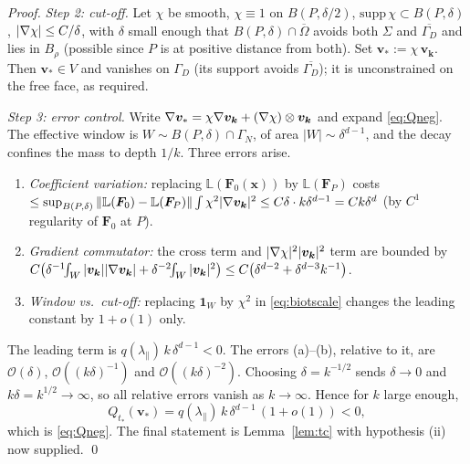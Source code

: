 \begin{proof}
    \emph{Step 2: cut-off.} Let $\chi$ be smooth, $\chi\equiv1$ on $B(P,\delta/2)$, $\mathrm{supp}\,\chi\subset
        B(P,\delta)$, $|\nabla\chi|\le C/\delta$, with $\delta$ small enough that $B(P,\delta)\cap\overline\Omega$ avoids
    both $\Sigma$ and $\overline{\Gamma_D}$ and lies in $B_\rho$ (possible since $P$ is at positive distance from both).
    Set $\bm{v}_*:=\chi\,\bm{v}_{\bm{k}}$. Then $\bm{v}_*\in V$ and vanishes on $\Gamma_D$ (its support avoids
    $\overline{\Gamma_D}$); it is unconstrained on the free face, as required.

    \emph{Step 3: error control.} Write $\nabla\bm{v}_*=\chi\nabla\bm{v}_{\bm{k}}+(\nabla\chi)\otimes\bm{v}_{\bm{k}}$ and
    expand \eqref{eq:Qneg}. The effective window is $W\sim B(P,\delta)\cap\Gamma_N$, of area $|W|\sim\delta^{d-1}$, and the
    decay confines the mass to depth $1/k$. Three errors arise.
    \begin{enumerate}
        \item[(a)] \emph{Coefficient variation:} replacing $\mathbb{L}(\bm{F}_0(\bm{x}))$ by $\mathbb{L}(\bm{F}_P)$ costs
              $\le \sup_{B(P,\delta)}\|\mathbb{L}(\bm{F}_0)-\mathbb{L}(\bm{F}_P)\|\int\chi^2|\nabla\bm{v}_{\bm{k}}|^2
                  \le C\delta\cdot k\delta^{d-1}=Ck\delta^{d}$ (by $C^1$ regularity of $\bm{F}_0$ at $P$).
        \item[(b)] \emph{Gradient commutator:} the cross term and $|\nabla\chi|^2|\bm{v}_{\bm{k}}|^2$ term are bounded by
              $C\big(\delta^{-1}\!\!\int_W |\bm{v}_{\bm{k}}||\nabla\bm{v}_{\bm{k}}| + \delta^{-2}\!\!\int_W|\bm{v}_{\bm{k}}|^2\big)
                  \le C\big(\delta^{d-2} + \delta^{d-3}k^{-1}\big)$.
        \item[(c)] \emph{Window vs.\ cut-off:} replacing $\mathbf{1}_W$ by $\chi^2$ in \eqref{eq:biotscale} changes the
              leading constant by $1+o(1)$ only.
    \end{enumerate}
    The leading term is $q(\lambda_\parallel)\,k\,\delta^{d-1}<0$. The errors (a)--(b), relative to it, are
    $\mathcal{O}(\delta)$, $\mathcal{O}((k\delta)^{-1})$ and $\mathcal{O}((k\delta)^{-2})$. Choosing $\delta=k^{-1/2}$
    sends $\delta\to0$ and $k\delta=k^{1/2}\to\infty$, so all relative errors vanish as $k\to\infty$. Hence for $k$ large
    enough,
    \[
        Q_{t_*}(\bm{v}_*) = q(\lambda_\parallel)\,k\,\delta^{d-1}\,(1+o(1)) < 0,
    \]
    which is \eqref{eq:Qneg}. The final statement is Lemma~\ref{lem:tc} with hypothesis (ii) now supplied. \qed
\end{proof}

